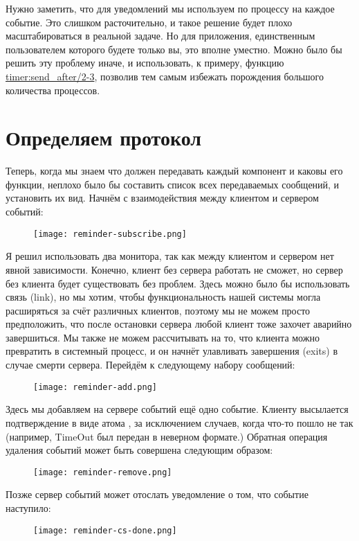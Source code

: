 Нужно заметить, что для уведомлений мы используем по процессу на каждое событие.
Это слишком расточительно, и такое решение будет плохо масштабироваться в реальной задаче.
Но для приложения, единственным пользователем которого будете только вы, это вполне уместно.
Можно было бы решить эту проблему иначе, и использовать, к примеру, функцию \href{http://erldocs.com/R15B/stdlib/timer.html\#send_after/2}{timer:send\_after/2-3}, позволив тем самым избежать порождения большого количества процессов.
\clearpage
\section{Определяем протокол}
\label{defining-the-protocol}
Теперь, когда мы знаем что должен передавать каждый компонент и каковы его функции, неплохо было бы составить список всех передаваемых сообщений, и установить их вид.
Начнём с взаимодействия между клиентом и сервером событий:
\begin{figure}[h!]
    \centering
    \texttt{[image: reminder-subscribe.png]}
\end{figure}

Я решил использовать два монитора, так как между клиентом и сервером нет явной зависимости.
Конечно, клиент без сервера работать не сможет, но сервер без клиента будет существовать без проблем.
Здесь можно было бы использовать связь (link), но мы хотим, чтобы функциональность нашей системы могла расширяться за счёт различных клиентов, поэтому мы не можем просто предположить, что после остановки сервера любой клиент тоже захочет аварийно завершиться.
Мы также не можем рассчитывать на то, что клиента можно превратить в системный процесс, и он начнёт улавливать завершения (exits) в случае смерти сервера.
Перейдём к следующему набору сообщений:
\begin{figure}[h!]
    \centering
    \texttt{[image: reminder-add.png]}
\end{figure}

Здесь мы добавляем на сервере событий ещё одно событие.
Клиенту высылается подтверждение в виде атома , за исключением случаев, когда что\--то пошло не так (например, TimeOut был передан в неверном формате.)
Обратная операция удаления событий может быть совершена следующим образом:
\begin{figure}[h!]
    \centering
    \texttt{[image: reminder-remove.png]}
\end{figure}

Позже сервер событий может отослать уведомление о том, что событие наступило:
\begin{figure}[h!]
    \centering
    \texttt{[image: reminder-cs-done.png]}
\end{figure}

